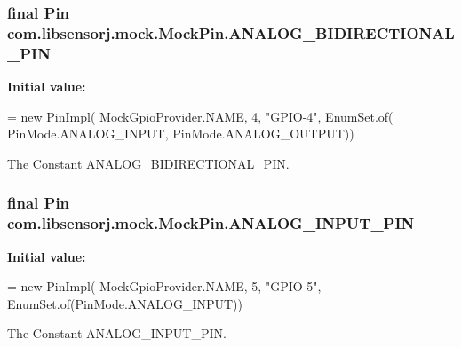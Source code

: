 \subsubsection[{A\+N\+A\+L\+O\+G\+\_\+\+B\+I\+D\+I\+R\+E\+C\+T\+I\+O\+N\+A\+L\+\_\+\+P\+I\+N}]{\setlength{\rightskip}{0pt plus 5cm}final Pin com.\+libsensorj.\+mock.\+Mock\+Pin.\+A\+N\+A\+L\+O\+G\+\_\+\+B\+I\+D\+I\+R\+E\+C\+T\+I\+O\+N\+A\+L\+\_\+\+P\+I\+N\hspace{0.3cm}{\ttfamily [static]}}\label{classcom_1_1libsensorj_1_1mock_1_1MockPin_a09976649e41290f5aa6c0d61fee67eda}
{\bfseries Initial value\+:}
\begin{DoxyCode}
= \textcolor{keyword}{new} PinImpl(
            MockGpioProvider.NAME, 4, \textcolor{stringliteral}{"GPIO-4"}, EnumSet.of(
                    PinMode.ANALOG\_INPUT, PinMode.ANALOG\_OUTPUT))
\end{DoxyCode}
The Constant A\+N\+A\+L\+O\+G\+\_\+\+B\+I\+D\+I\+R\+E\+C\+T\+I\+O\+N\+A\+L\+\_\+\+P\+I\+N. \hypertarget{classcom_1_1libsensorj_1_1mock_1_1MockPin_a3ca873ea424dac948fabb4c2249ea0a3}{}
\subsubsection[{A\+N\+A\+L\+O\+G\+\_\+\+I\+N\+P\+U\+T\+\_\+\+P\+I\+N}]{\setlength{\rightskip}{0pt plus 5cm}final Pin com.\+libsensorj.\+mock.\+Mock\+Pin.\+A\+N\+A\+L\+O\+G\+\_\+\+I\+N\+P\+U\+T\+\_\+\+P\+I\+N\hspace{0.3cm}{\ttfamily [static]}}\label{classcom_1_1libsensorj_1_1mock_1_1MockPin_a3ca873ea424dac948fabb4c2249ea0a3}
{\bfseries Initial value\+:}
\begin{DoxyCode}
= \textcolor{keyword}{new} PinImpl(
            MockGpioProvider.NAME, 5, \textcolor{stringliteral}{"GPIO-5"},
            EnumSet.of(PinMode.ANALOG\_INPUT))
\end{DoxyCode}
The Constant A\+N\+A\+L\+O\+G\+\_\+\+I\+N\+P\+U\+T\+\_\+\+P\+I\+N. \hypertarget{classcom_1_1libsensorj_1_1mock_1_1MockPin_ac0cb98f53fad4d229f1999253428e252}{}
